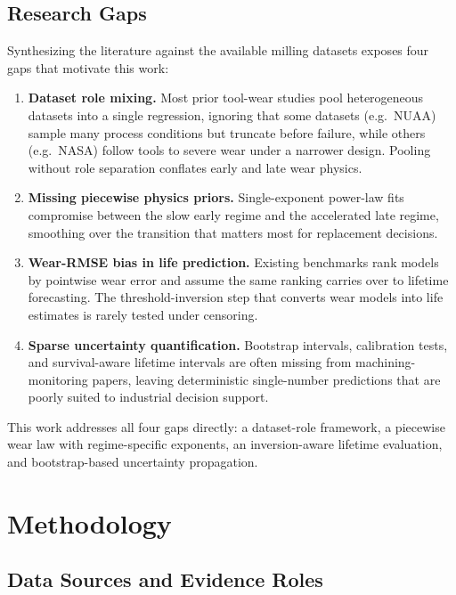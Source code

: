 \documentclass[11pt,a4paper]{article}
\newcommand{\dataset}[1]{\textsf{#1}}
\begin{document}
\subsection{Research Gaps}

Synthesizing the literature against the available milling datasets exposes four gaps that motivate this work:

\begin{enumerate}
  \item \textbf{Dataset role mixing.} Most prior tool-wear studies pool heterogeneous datasets into a single regression, ignoring that some datasets (e.g.\ \dataset{NUAA}) sample many process conditions but truncate before failure, while others (e.g.\ \dataset{NASA}) follow tools to severe wear under a narrower design. Pooling without role separation conflates early and late wear physics.
  \item \textbf{Missing piecewise physics priors.} Single-exponent power-law fits compromise between the slow early regime and the accelerated late regime, smoothing over the transition that matters most for replacement decisions.
  \item \textbf{Wear-RMSE bias in life prediction.} Existing benchmarks rank models by pointwise wear error and assume the same ranking carries over to lifetime forecasting. The threshold-inversion step that converts wear models into life estimates is rarely tested under censoring.
  \item \textbf{Sparse uncertainty quantification.} Bootstrap intervals, calibration tests, and survival-aware lifetime intervals are often missing from machining-monitoring papers, leaving deterministic single-number predictions that are poorly suited to industrial decision support.
\end{enumerate}

This work addresses all four gaps directly: a dataset-role framework, a piecewise wear law with regime-specific exponents, an inversion-aware lifetime evaluation, and bootstrap-based uncertainty propagation.

\section{Methodology}

\subsection{Data Sources and Evidence Roles}
\end{document}
